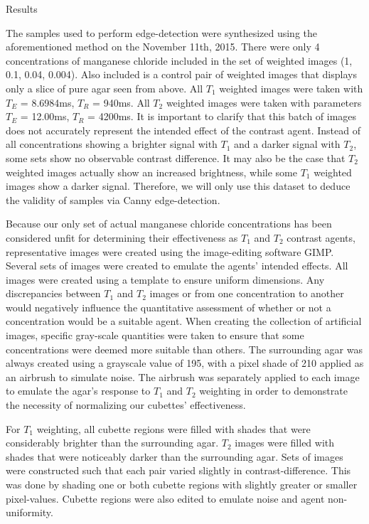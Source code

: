 \documentclass[a4paper,12pt]{article}
\begin{document}
\newpage
\begin{section}{Results}

The samples used to perform edge-detection were synthesized using the aforementioned method on the November 11th, 2015. There were only 4 concentrations of manganese chloride included in the set of weighted images (1, 0.1, 0.04, 0.004). Also included is a control pair of weighted images that displays only a slice of pure agar seen from above. All $T_1$ weighted images were taken with $T_E$ = 8.6984ms, $T_R$ = 940ms. All $T_2$ weighted images were taken with parameters $T_E$ = 12.00ms, $T_R$ = 4200ms. It is important to clarify that this batch of images does not accurately represent the intended effect of the contrast agent. Instead of all concentrations showing a brighter signal with $T_1$ and a darker signal with $T_2$, some sets show no observable contrast difference. It may also be the case that $T_2$ weighted images actually show an increased brightness, while some $T_1$ weighted images show a darker signal. Therefore, we will only use this dataset to deduce the validity of samples via Canny edge-detection. 

Because our only set of actual manganese chloride concentrations has been considered unfit for determining their effectiveness as $T_1$ and $T_2$ contrast agents, representative images were created using the image-editing software GIMP. Several sets of images were created to emulate the agents' intended effects. All images were created using a template to ensure uniform dimensions. Any discrepancies between $T_1$ and $T_2$ images or from one concentration to another would negatively influence the quantitative assessment of whether or not a concentration would be a suitable agent. When creating the collection of artificial images, specific gray-scale quantities were taken to ensure that some concentrations were deemed more suitable than others. The surrounding agar was always created using a grayscale value of 195, with a pixel shade of 210 applied as an airbrush to simulate noise. The airbrush was separately applied to each image to emulate the agar's response to $T_1$ and $T_2$ weighting in order to demonstrate the necessity of normalizing our cubettes' effectiveness. 

For $T_1$ weighting, all cubette regions were filled with shades that were considerably brighter than the surrounding agar. $T_2$ images were filled with shades that were noticeably darker than the surrounding agar. Sets of images were constructed such that each pair varied slightly in contrast-difference. This was done by shading one or both cubette regions with slightly greater or smaller pixel-values. Cubette regions were also edited to emulate noise and agent non-uniformity.


\end{section}
\end{document}
